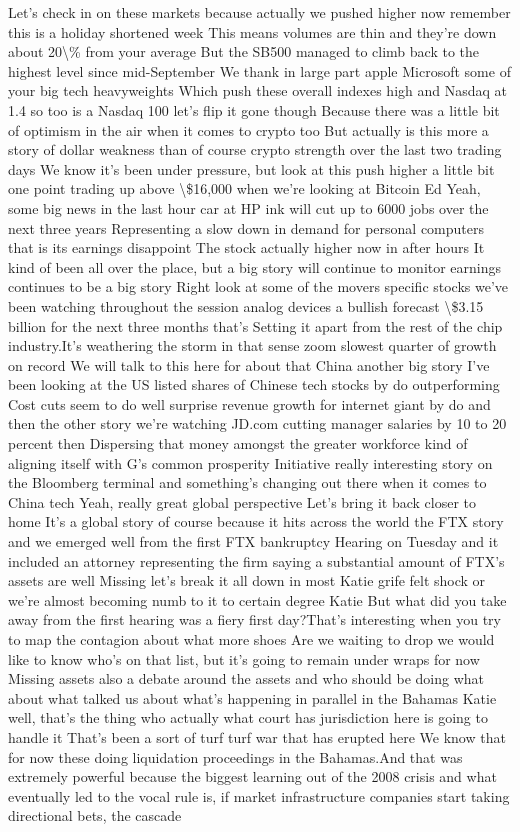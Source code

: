 \documentclass{article}%
\begin{document}
Let's check in on these markets because actually we pushed higher now remember this is a holiday shortened week This means volumes are thin and they're down about 20\textbackslash{}\% from your average But the SB500 managed to climb back to the highest level since mid{-}September We thank in large part apple Microsoft some of your big tech heavyweights Which push these overall indexes high and Nasdaq at 1.4 so too is a Nasdaq 100 let's flip it gone though Because there was a little bit of optimism in the air when it comes to crypto too But actually is this more a story of dollar weakness than of course crypto strength over the last two trading days We know it's been under pressure, but look at this push higher a little bit one point trading up above \textbackslash{}\$16,000 when we're looking at Bitcoin Ed Yeah, some big news in the last hour car at HP ink will cut up to 6000 jobs over the next three years Representing a slow down in demand for personal computers that is its earnings disappoint The stock actually higher now in after hours It kind of been all over the place, but a big story will continue to monitor earnings continues to be a big story Right look at some of the movers specific stocks we've been watching throughout the session analog devices a bullish forecast \textbackslash{}\$3.15 billion for the next three months that's Setting it apart from the rest of the chip industry.It's weathering the storm in that sense zoom slowest quarter of growth on record We will talk to this here for about that China another big story I've been looking at the US listed shares of Chinese tech stocks by do outperforming Cost cuts seem to do well surprise revenue growth for internet giant by do and then the other story we're watching JD.com cutting manager salaries by 10 to 20 percent then Dispersing that money amongst the greater workforce kind of aligning itself with G's common prosperity Initiative really interesting story on the Bloomberg terminal and something's changing out there when it comes to China tech Yeah, really great global perspective Let's bring it back closer to home It's a global story of course because it hits across the world the FTX story and we emerged well from the first FTX bankruptcy Hearing on Tuesday and it included an attorney representing the firm saying a substantial amount of FTX's assets are well Missing let's break it all down in most Katie grife felt shock or we're almost becoming numb to it to certain degree Katie But what did you take away from the first hearing was a fiery first day?That's interesting when you try to map the contagion about what more shoes Are we waiting to drop we would like to know who's on that list, but it's going to remain under wraps for now Missing assets also a debate around the assets and who should be doing what about what talked us about what's happening in parallel in the Bahamas Katie well, that's the thing who actually what court has jurisdiction here is going to handle it That's been a sort of turf turf war that has erupted here We know that for now these doing liquidation proceedings in the Bahamas.And that was extremely powerful because the biggest learning out of the 2008 crisis and what eventually led to the vocal rule is, if market infrastructure companies start taking directional bets, the cascade 
\end{document}
